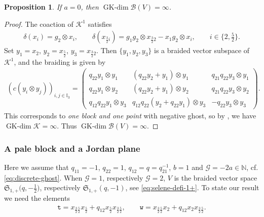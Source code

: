\documentclass[10pt,a4paper]{amsart}
\numberwithin{equation}{section}
\newtheorem{Proposition}[Theorem]{Proposition}
 { \theoremstyle{definition}
\newtheorem{Definition}[Theorem]{Definition}
\newtheorem{Note}[Theorem]{Note}
\newtheorem{Example}[Theorem]{Example}
\newtheorem{Remark}[Theorem]{Remark} }
\newcommand{\GK}{\operatorname{GK-dim}}
\newcommand{\toba}{\mathscr B}
\newcommand{\ghost}{\mathscr{G}}
\newcommand{\K}{{\mathcal{K}}}
\newcommand{\sele}{\mathfrak{S}}
\newcommand{\I}{{\mathbb I}}
\newcommand{\N}{{\mathbb N}}
\newcommand{\ttt}{\mathtt{t}}
\newcommand{\wt}{\mathtt{w}}
\newcommand{\tresdos}{\frac{3}{2}}
\newcommand{\cincodos}{\frac{5}{2}}
\begin{document}
\begin{Proposition}\label{prop:pale+Jordan-discarding}
If $a=0$, then $\GK \toba(V)=\infty$.
\end{Proposition}

\begin{proof}
The coaction of $\mathcal{K}^1$ satisfies
\begin{align*}
\delta(x_i) = g_2 \otimes x_i,\qquad
\delta(x_{\tresdos i}) = g_1g_2 \otimes x_{\tresdos2} - x_1g_2 \otimes x_i,\qquad
 i\in\big\{2,\tfrac{5}{2}\big\}.
\end{align*}
Set $y_1=x_2$, $y_2=x_{\cincodos}$, $y_3=x_{\tresdos2}$. Then $\{y_1, y_2, y_3\}$ is a braided vector subspace of $\K^1$, and the braiding is given by
\begin{align*}
(c(y_i \otimes y_j))_{i,j\in\I_3}=\begin{pmatrix}
q_{22} y_1 \otimes y_1& (q_{22} y_2 + y_1) \otimes y_1 & q_{21}q_{22} y_3 \otimes y_1
\\
q_{22} y_1 \otimes y_2 & (q_{22} y_2 + y_1) \otimes y_2 & q_{21}q_{22} y_3 \otimes y_2
\\
q_{12}q_{22} y_1 \otimes y_3 & q_{12}q_{22} (y_2 + q_{22}y_1) \otimes y_3 & -q_{22} y_3 \otimes y_3
\end{pmatrix}\!.
\end{align*}
This corresponds to \emph{one block and one point} with negative ghost, so by \cite[Theorem~4.1.1]{AAH-triang},
we have $\GK \K=\infty$.
Thus $\GK \toba(V)=\infty$.
\end{proof}



\subsubsection{A pale block and a Jordan plane}\label{subsubsec:pale-jordan}
Here we assume that $q_{11} = -1$, $q_{22}=1$, $q_{12} = q = q_{21}^{-1}$, $b=1$ and $\ghost =-2a \in \N$, cf. \eqref{eq:discrete-ghost}.
When $\ghost= 1$, respectively $\ghost=2$, $V$
is the braided vector space $\sele_{1,+}\big(q, -\frac12\big)$, respectively $\sele_{1,+}(q,-1)$, see \eqref{eq:selene-defi-1+}.
To state our result we need the elements
\begin{align}\label{eq:pale-Jordan-def-w-t}
\ttt= x_{\tresdos\cincodos}x_{\cincodos}+q_{12}x_{\cincodos}x_{\tresdos\cincodos},\qquad
\wt= x_{\tresdos\cincodos}x_{2}+q_{12}x_{2}x_{\tresdos\cincodos}.
\end{align}
\end{document}
